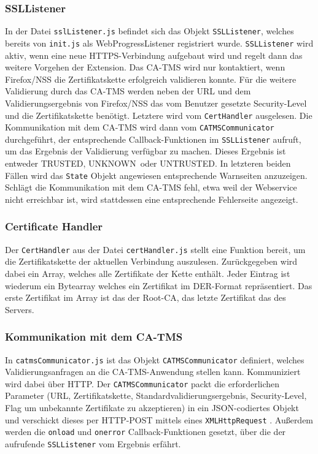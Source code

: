 \documentclass[accentcolor=tud1c,article,colorback,11pt]{tudreport}
\begin{document}
\subsubsection{SSLListener}
In der Datei \texttt{sslListener.js} befindet sich das Objekt \texttt{SSLListener}, welches bereits von \texttt{init.js} als WebProgressListener \cite{progressListener} registriert wurde. \texttt{SSLListener} wird aktiv, wenn eine neue HTTPS-Verbindung aufgebaut wird und regelt dann das weitere Vorgehen der Extension. Das CA-TMS wird nur kontaktiert, wenn Firefox/NSS die Zertifikatskette erfolgreich validieren konnte. Für die weitere Validierung durch das CA-TMS werden neben der URL und dem Validierungsergebnis von Firefox/NSS das vom Benutzer gesetzte Security-Level und die Zertifikatskette benötigt. Letztere wird vom \texttt{CertHandler} ausgelesen. Die Kommunikation mit dem CA-TMS wird dann vom \texttt{CATMSCommunicator} durchgeführt, der entsprechende Callback-Funktionen im \texttt{SSLListener} aufruft, um das Ergebnis der Validierung verfügbar zu machen. Dieses Ergebnis ist entweder \glqq TRUSTED\grqq, \glqq UNKNOWN\grqq~oder \glqq UNTRUSTED\grqq. In letzteren beiden Fällen wird das \texttt{State} Objekt angewiesen entsprechende Warnseiten anzuzeigen. Schlägt die Kommunikation mit dem CA-TMS fehl, etwa weil der Webservice nicht erreichbar ist, wird stattdessen eine entsprechende Fehlerseite angezeigt.

\subsubsection{Certificate Handler}
Der \texttt{CertHandler} aus der Datei \texttt{certHandler.js} stellt eine Funktion bereit, um die Zertifikatskette der aktuellen Verbindung auszulesen. Zurückgegeben wird dabei ein Array, welches alle Zertifikate der Kette enthält. Jeder Eintrag ist wiederum ein Bytearray welches ein Zertifikat im DER-Format \cite{DER} repräsentiert. Das erste Zertifikat im Array ist das der Root-CA, das letzte Zertifikat das des Servers.

\subsubsection{Kommunikation mit dem CA-TMS}
In \texttt{catmsCommunicator.js} ist das Objekt \texttt{CATMSCommunicator} definiert, welches Validierungsanfragen an die CA-TMS-Anwendung stellen kann. Kommuniziert wird dabei über HTTP. Der \texttt{CATMSCommunicator} packt die erforderlichen Parameter (URL, Zertifikatskette, Standardvalidierungsergebnis, Security-Level, Flag um unbekannte Zertifikate zu akzeptieren) in ein JSON-codiertes Objekt und verschickt dieses per HTTP-POST mittels eines \texttt{XMLHttpRequest} \cite{httpRequest}. Außerdem werden die \texttt{onload} und \texttt{onerror} Callback-Funktionen gesetzt, über die der aufrufende \texttt{SSLListener} vom Ergebnis erfährt.
\end{document}
